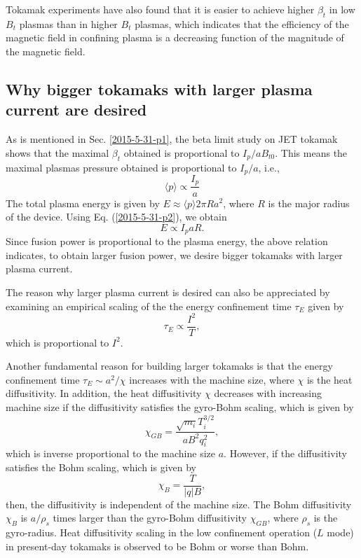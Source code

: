 \documentclass{article}
\begin{document}
Tokamak experiments have also found that it is easier to achieve higher
$\beta_t$ in low $B_t$ plasmas than in higher $B_t$ plasmas, which indicates
that the efficiency of the magnetic field in confining plasma is a decreasing
function of the magnitude of the magnetic field.

\subsection{Why bigger tokamaks with larger plasma current are desired}

As is mentioned in Sec. \ref{2015-5-31-p1}, the beta limit study on JET
tokamak shows that the maximal $\beta_t$ obtained is proportional to $I_p / a
B_{t 0}$. This means the maximal plasmas pressure obtained is proportional to
$I_p / a$, i.e.,
\begin{equation}
  \label{2015-5-31-p2} \langle p \rangle \propto \frac{I_p}{a}
\end{equation}
The total plasma energy is given by $E \approx \langle p \rangle 2 \pi R a^2$,
where $R$ is the major radius of the device. Using Eq. (\ref{2015-5-31-p2}),
we obtain
\begin{equation}
  E \propto I_p a R.
\end{equation}
Since fusion power is proportional to the plasma energy, the above relation
indicates, to obtain larger fusion power, we desire bigger tokamaks with
larger plasma current.

The reason why larger plasma current is desired can also be appreciated by
examining an empirical scaling of the the energy confinement time $\tau_E$
given by
\begin{equation}
  \tau_E \propto \frac{I^2}{T},
\end{equation}
which is proportional to $I^2$.

Another fundamental reason for building larger tokamaks is that the energy
confinement time $\tau_E \sim a^2 / \chi$ increases with the machine size,
where $\chi$ is the heat diffusitivity. In addition, the heat diffusitivity
$\chi$ decreases with increasing machine size if the diffusitivity satisfies
the gyro-Bohm scaling, which is given by
\begin{equation}
  \chi_{G B} = \frac{\sqrt{m_i} T_i^{3 / 2}}{a B^2 q^2_i},
\end{equation}
which is inverse proportional to the machine size $a$. However, if the
diffusitivity satisfies the Bohm scaling, which is given by
\begin{equation}
  \chi_B = \frac{T}{| q | B},
\end{equation}
then, the diffusitivity is independent of the machine size. The Bohm
diffusitivity $\chi_B$ is $a / \rho_s$ times larger than the gyro-Bohm
diffusitivity $\chi_{G B}$, where $\rho_s$ is the gyro-radius. Heat
diffusitivity scaling in the low confinement operation ($L$ mode) in
present-day tokamaks is observed to be Bohm or worse than Bohm.
\end{document}
